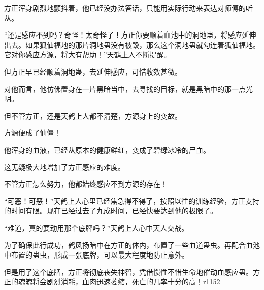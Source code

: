 \begin{this_body}
方正浑身剧烈地颤抖着，他已经没办法答话，只能用实际行动来表达对师傅的听从。

“还是感应不到吗？奇怪！太奇怪了！方正你要顺着血池中的洞地蛊，将感应延伸出去。如果狐仙福地的那片洞地蛊没有被毁，那么这个洞地蛊就勾连着狐仙福地。它对你感应方源，将大有帮助！”天鹤上人不断提醒。

但方正早已经顺着洞地蛊，去延伸感应，可惜收效甚微。

对他而言，他仿佛置身在一片黑暗当中，去寻找的目标，就是黑暗中的那一点光明。

但不管方正，还是天鹤上人都不清楚，方源身上的变故。

方源便成了仙僵！

他浑身的血液，已经从原本的健康鲜红，变成了碧绿冰冷的尸血。

这无疑极大地增加了方正感应的难度。

不管方正怎么努力，他都始终感应不到方源的存在！

“可恶！可恶！”天鹤上人心里已经焦急得不得了，按照以往的训练经验，方正支持的时间有限。现在已经过去了九成时间，已经快要达到他的极限了。

“难道，真的要动用那个底牌吗？”天鹤上人心中天人交战。

为了确保此行成功，鹤风扬暗中在方正的体内，布置了一些血道蛊虫。再配合血池中布置的蛊虫，形成一张底牌，可以最大程度地防止意外。

但是用了这个底牌，方正将彻底丧失神智，凭借惯性不惜生命地催动血感应蛊。方正的魂魄将会剧烈消耗，血肉迅速萎缩，死亡的几率十分的高！r1152

\end{this_body}

